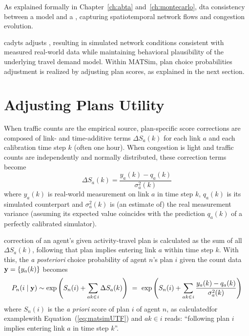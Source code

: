 As explained formally in Chapter~\ref{ch:abta} and~\ref{ch:montecarlo},
\gls{dta}  consistency between a  model and a
, capturing
spatiotemporal network flows and congestion evolution.

\gls{cadyts} adjusts , resulting in
simulated network conditions  consistent with measured
real-world data\corr{,}{} while maintaining  behavioral plausibility
of the underlying travel demand model.
Within MATSim, plan choice probabilities adjustment is realized 
by adjusting plan scores, as explained in the next section.

\section{Adjusting Plans Utility}

When traffic counts are the empirical source, plan-specific score corrections 
are composed of link- and time-additive terms $\Delta S_a(k)$ for each link $a$
and each calibration time step $k$ (often one hour). 
When congestion is light and traffic counts are independently and normally distributed, 
these correction terms become 
%
\begin{equation}
\label{eq:cadyts:correction}
\Delta S_a(k) = \frac{y_a(k) - q_a(k)} {\sigma_a^2(k)}
\end{equation}
%
where $y_a(k)$ is  real-world measurement on link $a$ in time step
$k$, $q_a(k)$ is its simulated counterpart and $\sigma^2_a(k)$ is (an estimate of) 
the real measurement variance  (assuming its expected value 
coincides with the prediction $q_a(k)$ of a perfectly calibrated simulator).

 correction of an agent's given activity-travel plan is
calculated as the sum of all $\Delta S_a(k)$,  following
that plan implies entering link $a$ within time step $k$.
With this, the \textit{a posteriori} choice probability of agent $n$'s plan
$i$\corr{,}{} given the count data ${\bf y} = \{y_a(k)\}$\corr{,}{}
becomes\corr{:}{}
\begin{equation}
P_n(i\mid{\bf y}) \sim 
\exp\left(S_n(i)+ \sum_{ak\in_{}i} \Delta S_a(k) \right)
\,\,=\,\,
\exp\left(S_n(i)+ \sum_{ak\in_{}i} \frac{y_a(k) - q_a(k)} {\sigma_a^2(k)} \right)
\label{eq:cadyts:selection}
\end{equation}
where $S_n(i)$ is the \textit{a priori} score of plan $i$ of agent $n$, as 
calculated\corr{--}{ }for example\corr{--}{ }with Equation~(\ref{eq:matsimUTF}) and $ak\in
i$ reads:
``following plan $i$ implies entering link $a$ in time step $k$''.

